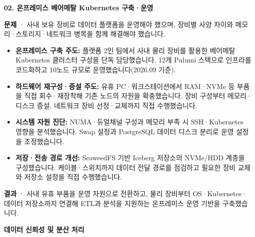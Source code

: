 \documentclass[a4paper,11pt]{article}
\newcommand{\project}[2]{\vspace{5pt}\textbf{\color{accent}#1}\hfill{\small\color{muted}#2}\par}
\begin{document}
\project{02. 온프레미스 베어메탈 Kubernetes 구축·운영}{}
\textbf{문제} · 사내 보유 장비로 데이터 플랫폼을 운영해야 했으며, 장비별 사양 차이와 메모리·스토리지·네트워크 병목을 함께 해결해야 했습니다.
\begin{itemize}
\item \textbf{온프레미스 구축 주도:} 플랫폼 2인 팀에서 사내 물리 장비를 활용한 베어메탈 Kubernetes 클러스터 구성을 단독 담당했습니다. 12개 Pulumi 스택으로 인프라를 코드화하고 10노드 규모로 운영했습니다(2026.09 기준).
\item \textbf{하드웨어 재구성·증설 주도:} 유휴 PC·워크스테이션에서 RAM·NVMe 등 부품을 직접 회수·재장착해 기존 노드의 자원을 확충했습니다. 장비 구성부터 메모리·디스크 증설, 네트워크 장비 선정·교체까지 직접 수행했습니다.
\item \textbf{시스템 자원 진단:} NUMA·듀얼채널 구성과 메모리 부족 시 SSH·Kubernetes 영향을 분석했습니다. Swap 설정과 PostgreSQL 데이터 디스크 분리로 운영 설정을 조정했습니다.
\item \textbf{저장·전송 경로 개선:} SeaweedFS 기반 Iceberg 저장소의 NVMe/HDD 계층을 구성했습니다. 케이블·스위치까지 데이터 전달 경로를 점검하고 필요한 장비 교체와 저장소 설정을 직접 수행했습니다.
\end{itemize}
\textbf{결과} · 사내 유휴 부품을 운영 자원으로 전환하고, 물리 장비부터 OS·Kubernetes·데이터 저장소까지 연결해 ETL과 분석을 지원하는 온프레미스 운영 기반을 구축했습니다.

\newpage
{\fontsize{21}{27}\selectfont\bfseries\color{accent}데이터 신뢰성 및 분산 처리}\par
\end{document}
